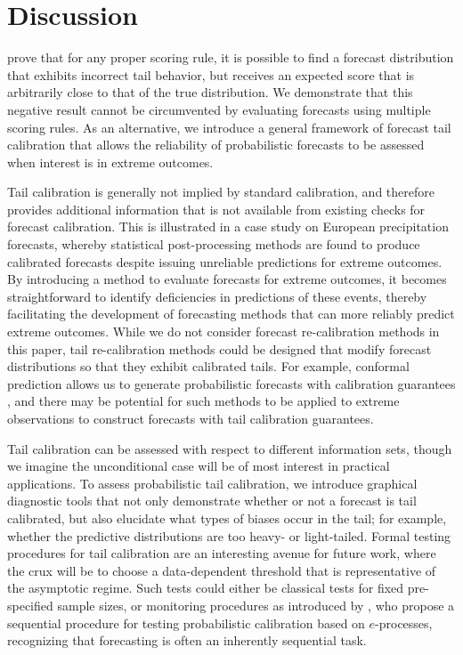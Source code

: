\documentclass[12pt]{article}
\newcommand{\1}{\mathbf{1}} %
\theoremstyle{definition}
\begin{document}
\section{Discussion}\label{sec:conclusion}

\cite{BrehmerStrokorb2019} prove that for any proper scoring rule, it is possible to find a forecast distribution that exhibits incorrect tail behavior, but receives an expected score that is arbitrarily close to that of the true distribution. We demonstrate that this negative result cannot be circumvented by evaluating forecasts using multiple scoring rules. As an alternative, we introduce a general framework of forecast tail calibration that allows the reliability of probabilistic forecasts to be assessed when interest is in extreme outcomes.


Tail calibration is generally not implied by standard calibration, and therefore provides additional information that is not available from existing checks for forecast calibration. This is illustrated in a case study on European precipitation forecasts, whereby statistical post-processing methods are found to produce calibrated forecasts despite issuing unreliable predictions for extreme outcomes. By introducing a method to evaluate forecasts for extreme outcomes, it becomes straightforward to identify deficiencies in predictions of these events, thereby facilitating the development of forecasting methods that can more reliably predict extreme outcomes. While we do not consider forecast re-calibration methods in this paper, tail re-calibration methods could be designed that modify forecast distributions so that they exhibit calibrated tails. For example, conformal prediction allows us to generate probabilistic forecasts with calibration guarantees \citep[see e.g.][]{VovkEtAl2022}, and there may be potential for such methods to be applied to extreme observations to construct forecasts with tail calibration guarantees.

Tail calibration can be assessed with respect to different information sets, though we imagine the unconditional case will be of most interest in practical applications. To assess probabilistic tail calibration, we introduce graphical diagnostic tools that not only demonstrate whether or not a forecast is tail calibrated, but also elucidate what types of biases occur in the tail; for example, whether the predictive distributions are too heavy- or light-tailed. Formal testing procedures for tail calibration are an interesting avenue for future work, where the crux will be to choose a data-dependent threshold that is representative of the asymptotic regime. Such tests could either be classical tests for fixed pre-specified sample sizes, or monitoring procedures as introduced by \cite{ArnoldHenziETAL2023}, who propose a sequential procedure for testing probabilistic calibration based on $e$-processes, recognizing that forecasting is often an inherently sequential task. 
\end{document}
